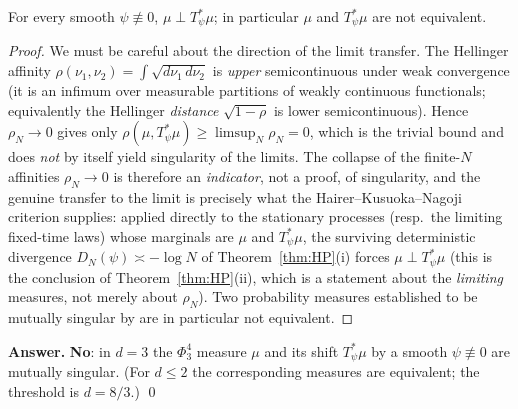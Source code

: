 \begin{qonetheorem}\label{thm:main}
For every smooth $\psi\not\equiv0$, $\mu\perp T_\psi^*\mu$; in particular $\mu$ and
$T_\psi^*\mu$ are not equivalent.
\end{qonetheorem}
\begin{proof}
We must be careful about the direction of the limit transfer. The Hellinger affinity
$\rho(\nu_1,\nu_2)=\int\sqrt{d\nu_1\,d\nu_2}$ is \emph{upper} semicontinuous under weak
convergence (it is an infimum over measurable partitions of weakly continuous
functionals; equivalently the Hellinger \emph{distance} $\sqrt{1-\rho}$ is lower
semicontinuous). Hence $\rho_N\to0$ gives only $\rho(\mu,T_\psi^*\mu)\ge\limsup_N\rho_N=0$,
which is the trivial bound and does \emph{not} by itself yield singularity of the limits.
The collapse of the finite-$N$ affinities $\rho_N\to0$ is therefore an \emph{indicator},
not a proof, of singularity, and the genuine transfer to the limit is precisely what the
Hairer--Kusuoka--Nagoji criterion \cite{HKN24} supplies: applied directly to the
stationary processes (resp.\ the limiting fixed-time laws) whose marginals are $\mu$ and
$T_\psi^*\mu$, the surviving deterministic divergence $D_N(\psi)\asymp-\log N$ of
Theorem~\ref{thm:HP}(i) forces $\mu\perp T_\psi^*\mu$ (this is the conclusion of
Theorem~\ref{thm:HP}(ii), which is a statement about the \emph{limiting} measures, not
merely about $\rho_N$). Two probability measures established to be mutually singular by
\cite{HKN24,HP25} are in particular not equivalent.
\end{proof}

\medskip
\noindent\textbf{Answer.} \textbf{No}: in $d=3$ the $\Phi^4_3$ measure $\mu$ and its
shift $T_\psi^*\mu$ by a smooth $\psi\not\equiv0$ are mutually singular. (For $d\le2$
the corresponding measures are equivalent; the threshold is $d=8/3$.)
\qed

